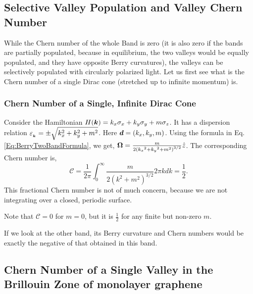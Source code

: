 \documentclass{report}
\renewcommand\vec[1]{\ensuremath\boldsymbol{#1}} %
\begin{document}
\subsection{Selective Valley Population and Valley Chern Number}
While the Chern number of the whole Band is zero (it is also zero if the bands are partially populated, because in equilibrium, the two valleys would be equally populated, and they have opposite Berry curvatures), the valleys can be selectively populated \cite{valleyPolBilayerGraphene} with circularly polarized light.
Let us first see what is the Chern number of a single Dirac cone (stretched up to infinite momentum) is.
\subsubsection{Chern Number of a Single, Infinite Dirac Cone}
Consider the Hamiltonian $H(\vec{k}) = k_x \sigma_x + k_y \sigma_y + m \sigma_z$. It has a dispersion relation $\varepsilon_{_{\vec{k}}} = \pm \sqrt{k_x^2 + k_y^2 + m^2}$. Here $\vec{d} = (k_x, k_y, m)$. Using the formula in Eq. \eqref{Eq:BerryTwoBandFormula}, we get, $\vec{\Omega} = \frac{m}{2\left({k_x}^{2}+{k_y}^{2}+m^{2}\right)^{3 / 2}} \hat{z}$.
The corresponding Chern number is, $$\mathcal{C} = \frac{1}{2\pi} \int_{0}^{\infty} \frac{m}{2\left(k^2+m^{2}\right)^{3 / 2}} 2 \pi k dk = \frac{1}{2}.$$
This fractional Chern number is not of much concern, because we are not integrating over a closed, periodic surface.

Note that $\mathcal{C} = 0$ for $m = 0$, but it is $\frac{1}{2}$ for any finite but non-zero $m$.

If we look at the other band, its Berry curvature and Chern numbers would be exactly the negative of that obtained in this band.
\subsection{Chern Number of a Single Valley in the Brillouin Zone of monolayer graphene}
\end{document}
